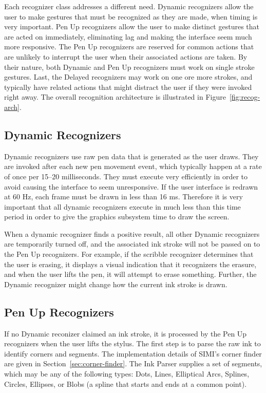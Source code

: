 

Each recognizer class addresses a different need. Dynamic recognizers
allow the user to make gestures that must be recognized as they are
made, when timing is very important. Pen Up recognizers allow the user
to make distinct gestures that are acted on immediately, eliminating
lag and making the interface seem much more responsive. The Pen Up
recognizers are reserved for common actions that are unlikely to
interrupt the user when their associated actions are taken. By their
nature, both Dynamic and Pen Up recognizers must work on single stroke
gestures. Last, the Delayed recognizers may work on one ore more
strokes, and typically have related actions that might distract the
user if they were invoked right away. The overall recognition
architecture is illustrated in Figure~\ref{fig:recog-arch}.

\subsection{Dynamic Recognizers}
\label{sec:overview-dynamic-recognizers}

Dynamic recognizers use raw pen data that is generated as the user
draws. They are invoked after each new pen movement event, which
typically happen at a rate of once per 15--20 milliseconds. They must
execute very efficiently in order to avoid causing the interface to
seem unresponsive. If the user interface is redrawn at 60 Hz, each
frame must be drawn in less than 16 ms. Therefore it is very important
that all dynamic recognizers execute in much less than this time
period in order to give the graphics subsystem time to draw the
screen.

When a dynamic recognizer finds a positive result, all other Dynamic
recognizers are temporarily turned off, and the associated ink stroke
will not be passed on to the Pen Up recognizers. For example, if the
scribble recognizer determines that the user is erasing, it displays a
visual indication that it recognizers the erasure, and when the user
lifts the pen, it will attempt to erase something. Further, the
Dynamic recognizer might change how the current ink stroke is drawn.

\subsection{Pen Up Recognizers}

If no Dynamic reconizer claimed an ink stroke, it is processed by the
Pen Up recognizers when the user lifts the stylus. The first step is
to parse the raw ink to identify corners and segments. The
implementation details of SIMI's corner finder are given in
Section~\ref{sec:corner-finder}. The Ink Parser supplies a set of
segments, which may be any of the following types: Dots, Lines,
Elliptical Arcs, Splines, Circles, Ellipses, or Blobs (a spline that
starts and ends at a common point).

